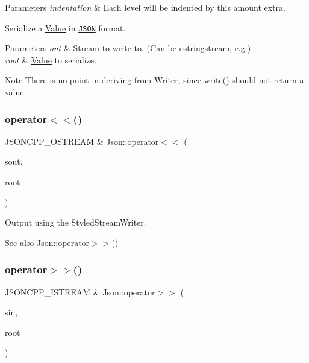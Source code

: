 \begin{DoxyParams}{Parameters}
{\em indentation} & Each level will be indented by this amount extra.\\
\hline
\end{DoxyParams}
Serialize a \hyperlink{classJson_1_1Value}{Value} in \href{http://www.json.org}{\tt J\+S\+ON} format. 
\begin{DoxyParams}{Parameters}
{\em out} & Stream to write to. (Can be ostringstream, e.\+g.) \\
\hline
{\em root} & \hyperlink{classJson_1_1Value}{Value} to serialize. \\
\hline
\end{DoxyParams}
\begin{DoxyNote}{Note}
There is no point in deriving from Writer, since write() should not return a value.
\end{DoxyNote}
\mbox{\label{namespaceJson_a975d1dbca8aa7a06f38d373edcb9081c}} 
\subsubsection{\texorpdfstring{operator$<$$<$()}{operator<<()}}
{\footnotesize\ttfamily J\+S\+O\+N\+C\+P\+P\+\_\+\+O\+S\+T\+R\+E\+AM \& Json\+::operator$<$$<$ (\begin{DoxyParamCaption}\item[{J\+S\+O\+N\+C\+P\+P\+\_\+\+O\+S\+T\+R\+E\+AM \&}]{sout,  }\item[{const \hyperlink{classJson_1_1Value}{Value} \&}]{root }\end{DoxyParamCaption})}



Output using the Styled\+Stream\+Writer. 

\begin{DoxySeeAlso}{See also}
\hyperlink{namespaceJson_a244ed0996aba750c40c1641c06bba449}{Json\+::operator$>$$>$()} 
\end{DoxySeeAlso}
\mbox{\label{namespaceJson_a244ed0996aba750c40c1641c06bba449}} 
\subsubsection{\texorpdfstring{operator$>$$>$()}{operator>>()}}
{\footnotesize\ttfamily J\+S\+O\+N\+C\+P\+P\+\_\+\+I\+S\+T\+R\+E\+AM \& Json\+::operator$>$$>$ (\begin{DoxyParamCaption}\item[{J\+S\+O\+N\+C\+P\+P\+\_\+\+I\+S\+T\+R\+E\+AM \&}]{sin,  }\item[{\hyperlink{classJson_1_1Value}{Value} \&}]{root }\end{DoxyParamCaption})}



